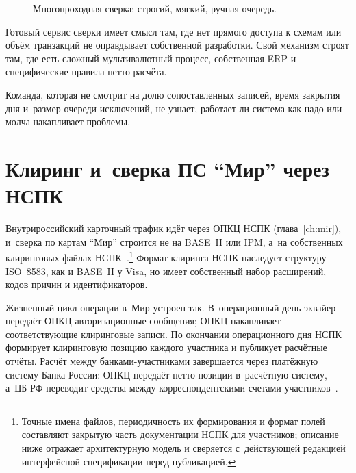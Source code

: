 \begin{figure}[tbp]
  \centering
  \caption{Многопроходная сверка: строгий, мягкий, ручная очередь.}\label{fig:matching-passes}
\end{figure}

Готовый сервис сверки имеет смысл там, где нет прямого доступа к
схемам или объём транзакций не оправдывает собственной разработки.
Свой механизм строят там, где есть сложный мультивалютный
процесс, собственная ERP и специфические правила нетто-расчёта.

Команда, которая не смотрит на долю сопоставленных записей, время
закрытия дня и~размер очереди исключений, не узнает, работает ли
система как надо или молча накапливает проблемы.


\section{Клиринг и~сверка ПС \enquote{Мир} через НСПК}\label{sec:recon-mir}

Внутрироссийский карточный трафик идёт через ОПКЦ НСПК
(глава~\ref{ch:mir}), и~сверка по картам \enquote{Мир}
строится не на BASE~II или IPM, а~на собственных клиринговых
файлах НСПК~\cite{nspk-mir-rules}.\footnote{Точные имена
файлов, периодичность их формирования и формат полей
составляют закрытую часть документации НСПК для участников;
описание ниже отражает архитектурную модель и сверяется
с~действующей редакцией интерфейсной спецификации перед
публикацией.} Формат клиринга НСПК наследует структуру
ISO~8583, как и BASE~II у Visa, но имеет собственный набор
расширений, кодов причин и идентификаторов.

Жизненный цикл операции в~Мир устроен так.
В~операционный день эквайер передаёт ОПКЦ авторизационные
сообщения; ОПКЦ накапливает соответствующие клиринговые
записи. По окончании операционного дня НСПК формирует
клиринговую позицию каждого участника и публикует расчётные
отчёты. Расчёт между банками-участниками завершается
через платёжную систему Банка России: ОПКЦ передаёт нетто-позиции
в~расчётную систему, а~ЦБ РФ переводит средства между
корреспондентскими счетами участников~\cite{fz-161}.

